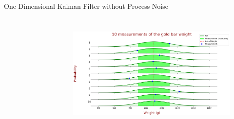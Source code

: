 \begin{frame}{One Dimensional Kalman Filter without Process Noise}
\begin{columns}
\begin{figure}
		    \label{fig:ex1_estimationAlgorithm}
	    \end{figure}
	    \vspace{-12pt}
        \begin{figure}
		    \centering
		   \includegraphics[width=1\textwidth]{Figures/Chapter1/PDFs.png}
		    \label{fig:PDFs}
	    \end{figure}
\end{columns}
    
\end{frame}

